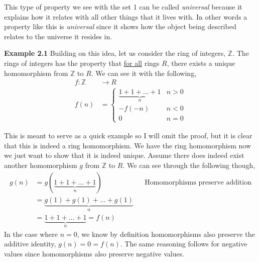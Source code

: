 \documentclass[12pt]{article}
\theoremstyle{definition}
\theoremstyle{remark}
\newcommand      {\Zm}         {{\mathbb Z}}
\begin{document}
This type of property we see with the set 1 can be called \textit{universal} because it explains how it relates with all other things that it lives with. In other words a property like this is \textit{universal} since it shows how the object being described relates to the universe it resides in. 
\vspace{0.5cm}

\noindent\textbf{Example 2.1}
Building on this idea, let us consider the ring of integers, $\Zm$. The rings of integers has the property that \underline{for all} rings $R$, there exists a unique homomorphism from $\Zm$ to $R$. We can see it with the following,
\begin{align*}
    f: \Zm &\to R \\
    f(n) &= \begin{cases}
        \underbrace{1 + 1 + \dots + 1}_n & n > 0 \\
        -f(-n)& n < 0 \\
        0 & n = 0 
    \end{cases}
\end{align*}

This is meant to serve as a quick example so I will omit the proof, but it is clear that this is indeed a ring homomorphism. We have the ring homomorphism now we just want to show that it is indeed unique. Assume there does indeed exist another homomorphism $g$ from $\Zm$ to $R$. We can see through the following though,
\begin{align*}
    g(n) &= g(\underbrace{1 + 1 + \dots + 1}_n) && \text{Homomorphisms preserve addition} \\
    &= \underbrace{g(1) + g(1) + \dots +g(1)}_n \\
    &= \underbrace{1 + 1 + \dots + 1}_n = f(n)
\end{align*}  
In the case where $n = 0$, we know by definition homomorphisms also preserve the additive identity, $g(n) = 0 = f(n)$. The same reasoning follows for negative values since homomorphisms also preserve negative values. 
\end{document}
